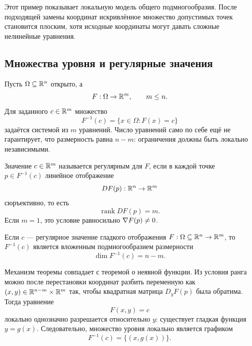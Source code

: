 Этот пример показывает локальную модель общего подмногообразия. После подходящей замены координат искривлённое множество допустимых точек становится плоским, хотя исходные координаты могут давать сложные нелинейные уравнения.

\subsection{Множества уровня и регулярные значения}

Пусть \(\Omega\subseteq\mathbb{R}^n\) открыто, а
\[
F:\Omega\to\mathbb{R}^m,
\qquad
m\leq n.
\]
Для заданного \(c\in\mathbb{R}^m\) множество
\[
F^{-1}(c)=\{x\in\Omega:F(x)=c\}
\]
задаётся системой из \(m\) уравнений. Число уравнений само по себе ещё не гарантирует, что размерность равна \(n-m\): ограничения должны быть локально независимыми.

\begin{definition}
Значение \(c\in\mathbb{R}^m\) называется регулярным для \(F\), если в каждой точке \(p\in F^{-1}(c)\) линейное отображение
\[
DF(p):\mathbb{R}^n\to\mathbb{R}^m
\]
сюръективно, то есть
\begin{equation}
\label{eq:regular-value-rank-condition}
\operatorname{rank}DF(p)=m.
\end{equation}
Если \(m=1\), это условие равносильно \(\nabla F(p)\neq0\).
\end{definition}

\begin{theorem}
\label{thm:regular-level-set}
Если \(c\) --- регулярное значение гладкого отображения \(F:\Omega\subseteq\mathbb{R}^n\to\mathbb{R}^m\), то \(F^{-1}(c)\) является вложенным подмногообразием размерности
\begin{equation}
\label{eq:regular-level-set-dimension}
\dim F^{-1}(c)=n-m.
\end{equation}
\end{theorem}

Механизм теоремы совпадает с теоремой о неявной функции. Из условия ранга можно после перестановки координат разбить переменную как \((x,y)\in\mathbb{R}^{n-m}\times\mathbb{R}^m\) так, чтобы квадратная матрица \(D_yF(p)\) была обратима. Тогда уравнение
\[
F(x,y)=c
\]
локально однозначно разрешается относительно \(y\): существует гладкая функция \(y=g(x)\). Следовательно, множество уровня локально является графиком
\[
F^{-1}(c)=\{(x,g(x))\}.
\]

